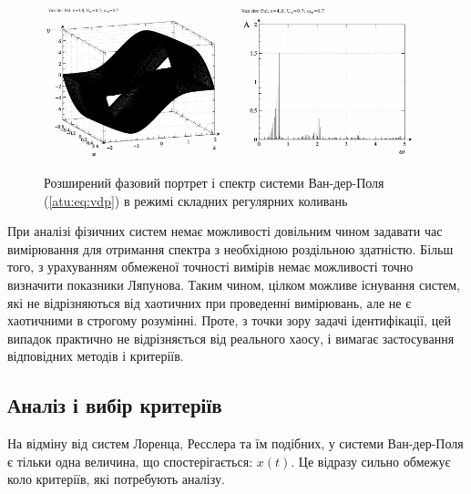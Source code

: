 \begin{figure}[ht!]
\begin{center}
  \includegraphics[width=0.49\textwidth]{p/cha/vdp/vdp_0-p_ph2d_4x80_0x70_0x70.png}
  \hfill
  \includegraphics[width=0.49\textwidth]{p/cha/vdp/vdp_fft-p_f_4x80_0x70_0x70.png}
\end{center}
\caption{Розширений фазовий портрет і спектр системи Ван-дер-Поля (\ref{atu:eq:vdp}) в режимі складних регулярних коливань}
\label{atu:f:vdp_phase_f_complex}
\end{figure}

При аналізі фізичних систем немає можливості довільним чином
задавати час вимірювання для отримання спектра з необхідною
роздільною здатністю. Більш того, з урахуванням обмеженої точності вимірів
немає можливості точно визначити показники Ляпунова. Таким
чином, цілком можливе існування систем, які не відрізняються
від хаотичних при проведенні вимірювань, але не є хаотичними в
строгому розумінні. Проте, з точки зору задачі ідентифікації,
цей випадок практично не відрізняється від реального хаосу,
і вимагає застосування відповідних методів і критеріїв.



\subsection{Аналіз і вибір критеріїв}%

На відміну від систем Лоренца, Ресслера та їм подібних, у системи
Ван-дер-Поля є тільки одна величина, що спостерігається: $x(t)$. Це
відразу сильно обмежує коло критеріїв, які потребують аналізу.

